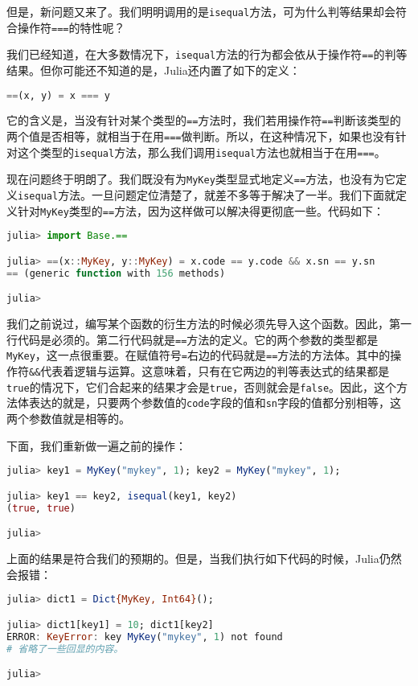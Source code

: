 但是，新问题又来了。我们明明调用的是\verb|isequal|方法，可为什么判等结果却会符合操作符\verb|===|的特性呢？

我们已经知道，在大多数情况下，\verb|isequal|方法的行为都会依从于操作符\verb|==|的判等结果。但你可能还不知道的是，Julia还内置了如下的定义：
\begin{lstlisting}[language=julia]
==(x, y) = x === y
\end{lstlisting}

它的含义是，当没有针对某个类型的\verb|==|方法时，我们若用操作符\verb|==|判断该类型的两个值是否相等，就相当于在用\verb|===|做判断。所以，在这种情况下，如果也没有针对这个类型的\verb|isequal|方法，那么我们调用\verb|isequal|方法也就相当于在用\verb|===|。

现在问题终于明朗了。我们既没有为\verb|MyKey|类型显式地定义\verb|==|方法，也没有为它定义\verb|isequal|方法。一旦问题定位清楚了，就差不多等于解决了一半。我们下面就定义针对\verb|MyKey|类型的\verb|==|方法，因为这样做可以解决得更彻底一些。代码如下：
\begin{lstlisting}[language=julia]
julia> import Base.==

julia> ==(x::MyKey, y::MyKey) = x.code == y.code && x.sn == y.sn
== (generic function with 156 methods)

julia> 
\end{lstlisting}

我们之前说过，编写某个函数的衍生方法的时候必须先导入这个函数。因此，第一行代码是必须的。第二行代码就是\verb|==|方法的定义。它的两个参数的类型都是\verb|MyKey|，这一点很重要。在赋值符号\verb|=|右边的代码就是\verb|==|方法的方法体。其中的操作符\verb|&&|代表着逻辑与运算。这意味着，只有在它两边的判等表达式的结果都是\verb|true|的情况下，它们合起来的结果才会是\verb|true|，否则就会是\verb|false|。因此，这个方法体表达的就是，只要两个参数值的\verb|code|字段的值和\verb|sn|字段的值都分别相等，这两个参数值就是相等的。

下面，我们重新做一遍之前的操作：
\begin{lstlisting}[language=julia]
julia> key1 = MyKey("mykey", 1); key2 = MyKey("mykey", 1);

julia> key1 == key2, isequal(key1, key2)
(true, true)

julia>
\end{lstlisting}

上面的结果是符合我们的预期的。但是，当我们执行如下代码的时候，Julia仍然会报错：
\begin{lstlisting}[language=julia]
julia> dict1 = Dict{MyKey, Int64}(); 

julia> dict1[key1] = 10; dict1[key2]
ERROR: KeyError: key MyKey("mykey", 1) not found
# 省略了一些回显的内容。

julia>  
\end{lstlisting}

